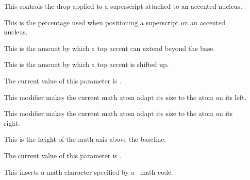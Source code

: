 \startnewprimitive[title={\prm {Umathaccentsuperscriptdrop}}]

This controls the drop applied to a superscript attached to an accented nucleus.

\stopnewprimitive

\startnewprimitive[title={\prm {Umathaccentsuperscriptpercent}}]

This is the percentage used when positioning a superscript on an accented
nucleus.

\stopnewprimitive

\startnewprimitive[title={\prm {Umathaccenttopovershoot}}]

This is the amount by which a top accent can extend beyond the base.

\stopnewprimitive

\startnewprimitive[title={\prm {Umathaccenttopshiftup}}]

This is the amount by which a top accent is shifted up.

\stopnewprimitive

\startnewprimitive[title={\prm {Umathaccentvariant}}]

The current value of this parameter is \CurrentMathVariant \Umathaccentvariant.

\stopnewprimitive

\startnewprimitive[title={\prm {Umathadapttoleft}}]

This modifier makes the current math atom adapt its size to the atom on its left.

\stopnewprimitive

\startnewprimitive[title={\prm {Umathadapttoright}}]

This modifier makes the current math atom adapt its size to the atom on its
right.

\stopnewprimitive

\startnewprimitive[title={\prm {Umathaxis}}]

This is the height of the math axis above the baseline.

\stopnewprimitive

\startnewprimitive[title={\prm {Umathbottomaccentvariant}}]

The current value of this parameter is \CurrentMathVariant \Umathbottomaccentvariant.

\stopnewprimitive

\startnewprimitive[title={\prm {Umathchar}}]

This inserts a math character specified by a \UNICODE\ math code.

